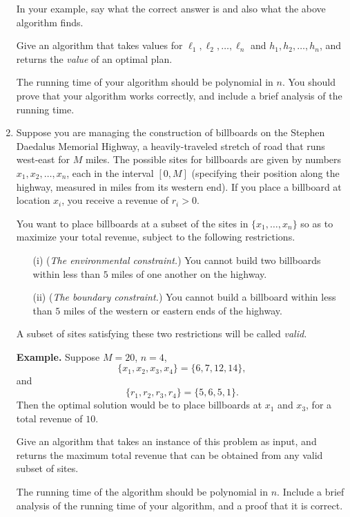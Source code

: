 \documentclass[12pt]{article}
\begin{document}
\begin{enumerate}
In your example, say what the correct answer is and
also what the above algorithm finds.


Give an algorithm that takes values for
$\ell_1, \ell_2, \ldots, \ell_n$ and $h_1, h_2, \ldots, h_n$,
and returns the {\em value} of an optimal plan.

The running time of your algorithm should be polynomial in $n$.
You should prove that your algorithm works correctly, and include a
brief analysis of the running time.





\item

Suppose you are managing the construction of billboards
on the Stephen Daedalus Memorial Highway,
a heavily-traveled stretch of road that runs west-east for $M$ miles.
The possible sites for billboards are given
by numbers $x_1, x_2, \ldots, x_n$, each in
the interval $[0,M]$ (specifying their position
along the highway, measured in miles from its western end).
If you place a billboard at location $x_i$,
you receive a revenue of $r_i > 0.$

You want to place billboards at a subset of the sites
in $\{x_1, \ldots, x_n\}$
so as to maximize your total revenue, subject to the
following restrictions.
\begin{itemize}
\item[(i)] ({\em The environmental constraint.})
You cannot build two billboards within less than
$5$ miles of one another on the highway.
\item[(ii)] ({\em The boundary constraint.})
You cannot build a billboard within less than
$5$ miles of the western or eastern ends of the highway.
\end{itemize}
A subset of sites satisfying these two
restrictions will be called {\em valid.}

\medskip
{\bf Example.}
Suppose $M = 20$, $n = 4$,
$$\{x_1, x_2, x_3, x_4\} = \{6, 7, 12, 14\},$$ and
$$\{r_1, r_2, r_3, r_4\} = \{5, 6, 5, 1\}.$$
Then the optimal solution would be
to place billboards at $x_1$ and $x_3$, for
a total revenue of $10$.

\medskip
Give an algorithm that takes an instance
of this problem as input, and returns
the maximum total revenue that can be obtained
from any valid subset of sites.

The running time of the algorithm should be polynomial in $n$.
Include a brief analysis of the running time of your algorithm, and
a proof that it is correct.



\end{enumerate}
\end{document}
